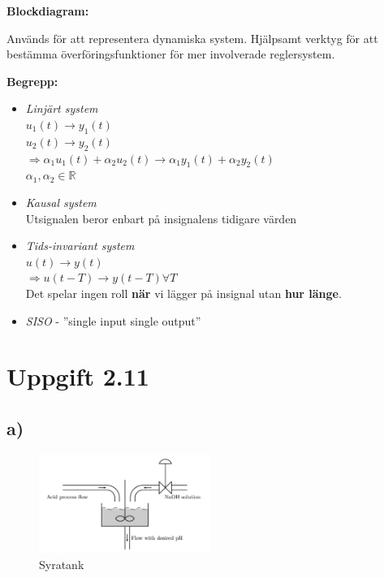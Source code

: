 \documentclass[12pt]{article}
\begin{document}
\textbf{Blockdiagram:}


Används för att representera dynamiska system. Hjälpsamt verktyg för att bestämma överföringsfunktioner för mer involverade reglersystem.

\textbf{Begrepp:}
\begin{itemize}
\item \textit{Linjärt system} \\
$u_1(t) \rightarrow y_1(t)$ \\
$u_2(t) \rightarrow y_2(t)$ \\
$\Rightarrow \alpha_1 u_1(t) + \alpha_2 u_2(t) \rightarrow \alpha_1y_1(t) + \alpha_2y_2(t)$ \\
$\alpha_1, \alpha_2 \in \mathbb{R}$
\item \textit{Kausal system} \\
Utsignalen beror enbart på insignalens tidigare värden
\item \textit{Tids-invariant system} \\
$u(t) \rightarrow y(t) $ \\
$\Rightarrow u(t-T) \rightarrow y(t-T) \forall T$ \\
Det spelar ingen roll \textbf{när} vi lägger på insignal utan \textbf{hur länge}.
\item \textit{SISO} - ''single input single output''
\end{itemize}

\section*{Uppgift 2.11}
\subsection*{a)}

\begin{figure}[h!]
  \centering
  \includegraphics[width=0.5\textwidth]{syratank}
  \caption{Syratank}
  \label{fig:syratank}
\end{figure}
\end{document}
